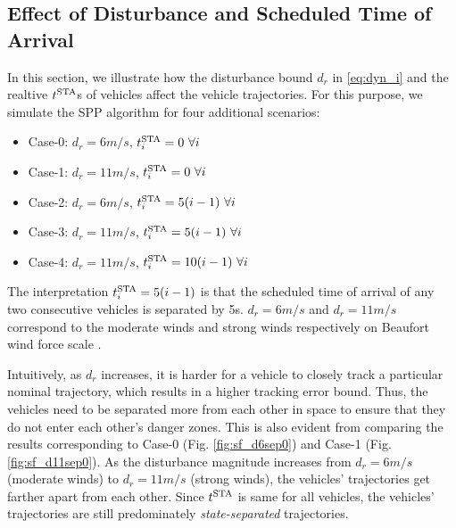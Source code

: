 \subsection{Effect of Disturbance and Scheduled Time of Arrival \label{sec:city_distbEffect}}
In this section, we illustrate how the disturbance bound $d_r$ in \eqref{eq:dyn_i} and the realtive $t^\text{STA}$s of vehicles affect the vehicle trajectories. For this purpose, we simulate the SPP algorithm for four additional scenarios:
\begin{itemize}
\item Case-0: $d_r = 6m/s$, $t^\text{STA}_i = 0 ~\forall i$
\item Case-1: $d_r = 11m/s$, $t^\text{STA}_i = 0 ~\forall i$
\item Case-2: $d_r = 6m/s$, $t^\text{STA}_i = 5(i-1) ~\forall i$
\item Case-3: $d_r = 11m/s$, $t^\text{STA}_i = 5(i-1) ~\forall i$
\item Case-4: $d_r = 11m/s$, $t^\text{STA}_i = 10(i-1) ~\forall i$
\end{itemize}
The interpretation $t^\text{STA}_i = 5(i-1)$ is that the scheduled time of arrival of any two consecutive vehicles is separated by 5s. $d_r = 6m/s$ and $d_r = 11m/s$ correspond to the moderate winds and strong winds respectively on Beaufort wind force scale \cite{Windscale}. 

Intuitively, as $d_r$ increases, it is harder for a vehicle to closely track a particular nominal trajectory, which results in a higher tracking error bound. Thus, the vehicles need to be separated more from each other in space to ensure that they do not enter each other's danger zones. This is also evident from comparing the results corresponding to Case-0 (Fig. \ref{fig:sf_d6sep0}) and Case-1 (Fig. \ref{fig:sf_d11sep0}). As the disturbance magnitude increases from $d_r = 6m/s$ (moderate winds) to $d_r = 11m/s$ (strong winds), the vehicles' trajectories get farther apart from each other. Since $t^\text{STA}$ is same for all vehicles, the vehicles’ trajectories are still predominately \textit{state-separated} trajectories.

